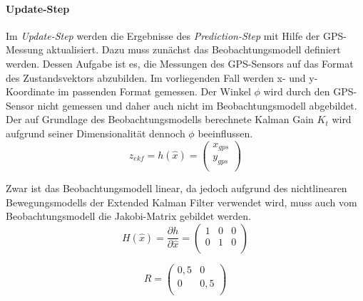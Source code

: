 \documentclass[11pt]{article}
\begin{document}
\paragraph{Update-Step}
Im \textit{Update-Step} werden die Ergebnisse des \textit{Prediction-Step} mit Hilfe der GPS-Messung aktualisiert. Dazu muss zunächst das Beobachtungsmodell definiert werden. Dessen Aufgabe ist es, die Messungen des GPS-Sensors auf das Format des Zustandsvektors abzubilden. Im vorliegenden Fall werden x- und y-Koordinate im passenden Format gemessen. Der Winkel $\phi$ wird durch den GPS-Sensor nicht gemessen und daher auch nicht im Beobachtungsmodell abgebildet. Der auf Grundlage des Beobachtungsmodells berechnete Kalman Gain $K_t$ wird aufgrund seiner Dimensionalität dennoch $\phi$ beeinflussen.
\begin{equation}\label{EKF-Observation-Model}
	z_{ekf} = h(\hat{x}) = \begin{pmatrix}
		x_{gps} \\
		y_{gps} \\
	\end{pmatrix}
\end{equation}

Zwar ist das Beobachtungsmodell linear, da jedoch aufgrund des nichtlinearen Bewegungsmodells der Extended Kalman Filter verwendet wird, muss auch vom Beobachtungsmodell die Jakobi-Matrix gebildet werden.
\begin{equation}\label{EKF-Observation-Model-Jakobi-Matrix}
	H(\hat{x})= \frac{\partial h}{\partial \hat{x}} = \begin{pmatrix}
		1 & 0 & 0 \\
		0 & 1 & 0 \\
	\end{pmatrix}
\end{equation}

\begin{equation}\label{GPS-Messungenauigkeits-Matrix}
	R = \begin{pmatrix}
		0,5 & 0 \\
		0 & 0,5 \\
	\end{pmatrix}
\end{equation}
\end{document}
